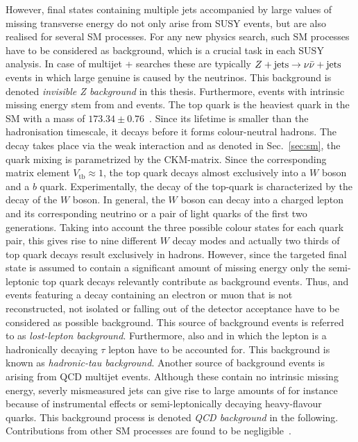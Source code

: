 However, final states containing multiple jets accompanied by large values of missing transverse energy do not only arise from SUSY events, but are also realised for several SM processes. For any new physics search, such SM processes have to be considered as background, which is a crucial task in each SUSY analysis. In case of multijet + \met searches these are typically $Z+\text{jets} \rightarrow \nu \bar{\nu} + \mathrm{jets}$ events in which large genuine \met is caused by the neutrinos. This background is denoted \textit{invisible Z background} in this thesis. Furthermore, events with intrinsic missing energy stem from \WJets and \ttbar events. The top quark is the heaviest quark in the SM with a mass of $173.34 \pm 0.76$\gev~\cite{ATLAS:2014wva}. Since its lifetime is smaller than the hadronisation timescale, it decays before it forms colour-neutral hadrons. The decay takes place via the weak interaction and as denoted in Sec.~\ref{sec:sm}, the quark mixing is parametrized by the CKM-matrix. Since the corresponding matrix element $V_{\mathrm{tb}} \approx 1$, the top quark decays almost exclusively into a $W$ boson and a $b$ quark. Experimentally, the decay of the top-quark is characterized by the decay of the $W$ boson. In general, the $W$ boson can decay into a charged lepton and its corresponding neutrino or a pair of light quarks of the first two generations. Taking into account the three possible colour states for each quark pair, this gives rise to nine different $W$ decay modes and actually two thirds of top quark decays result exclusively in hadrons. However, since the targeted final state is assumed to contain a significant amount of missing energy only the semi-leptonic top quark decays relevantly contribute as background events. Thus, \WJets and \ttbar events featuring a decay containing an electron or muon that is not reconstructed, not isolated or falling out of the detector acceptance have to be considered as possible background. This source of background events is referred to as \textit{lost-lepton background}. Furthermore, also \WJets and \ttbar in which the lepton is a hadronically decaying $\tau$ lepton have to be accounted for. This background is known as \textit{hadronic-tau background}. Another source of background events is arising from QCD multijet events. Although these contain no intrinsic missing energy, severly mismeasured jets can give rise to large amounts of \met for instance because of instrumental effects or semi-leptonically decaying heavy-flavour quarks. This background process is denoted \textit{QCD background} in the following. Contributions from other SM processes are found to be negligible~\cite{springerlink:10.1007/JHEP08(2011)155, Chatrchyan:2012lia}. \\
